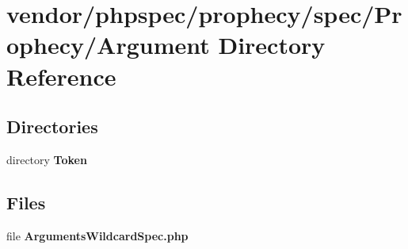 \section{vendor/phpspec/prophecy/spec/\+Prophecy/\+Argument Directory Reference}
\label{dir_a961385fb1824d12dfd33a9fa6f28fb5}
\subsection*{Directories}
\begin{DoxyCompactItemize}
\item 
directory {\bf Token}
\end{DoxyCompactItemize}
\subsection*{Files}
\begin{DoxyCompactItemize}
\item 
file {\bf Arguments\+Wildcard\+Spec.\+php}
\end{DoxyCompactItemize}
